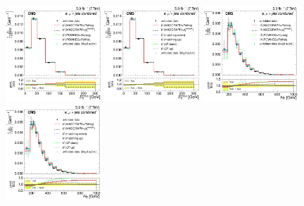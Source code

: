 \begin{figure}[hbtp]
    \centering
     \includegraphics[width=0.32\textwidth]{Chapters/04_Analysis/04b_XSections/images/results/fit/7TeV/MET/central/normalised_xsection_combined_different_generators_with_bkgd_subtraction_results.pdf}\hfill
     \includegraphics[width=0.32\textwidth]{Chapters/04_Analysis/04b_XSections/images/results/fit/7TeV/MET/central/normalised_xsection_combined_systematics_shifts_with_bkgd_subtraction_results.pdf}\hfill
     \includegraphics[width=0.32\textwidth]{Chapters/04_Analysis/04b_XSections/images/results/fit/7TeV/HT/central/normalised_xsection_combined_different_generators_with_bkgd_subtraction_results.pdf}\\
     \includegraphics[width=0.32\textwidth]{Chapters/04_Analysis/04b_XSections/images/results/fit/7TeV/HT/central/normalised_xsection_combined_systematics_shifts_with_bkgd_subtraction_results.pdf}\hfill

\end{figure}
